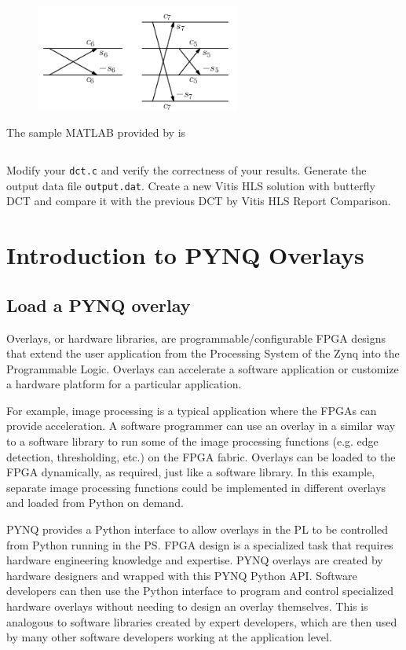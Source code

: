 \documentclass[a4paper,12pt,twoside]{article}
\begin{document}
\begin{figure}[H]
    \centering
    \includegraphics[width=0.6\textwidth]{images/26.png}
\end{figure}
The sample MATLAB provided by \cite{ryg} is
\inputminted[breaklines,linenos]{matlab}{bink_dct_B2.m}
Modify your \texttt{dct.c} and verify the correctness of your results. Generate the output data file \texttt{output.dat}. Create a new Vitis HLS solution with butterfly DCT and compare it with the previous DCT by Vitis HLS Report Comparison.

\section{Introduction to PYNQ Overlays}\label{SPynq}
\subsection{Load a PYNQ overlay}\label{S51}
Overlays, or hardware libraries, are programmable/configurable FPGA designs that extend the user application from the Processing System of the Zynq into the Programmable Logic. Overlays can accelerate a software application or customize a hardware platform for a particular application.

For example, image processing is a typical application where the FPGAs can provide acceleration. A software programmer can use an overlay in a similar way to a software library to run some of the image processing functions (e.g. edge detection, thresholding, etc.) on the FPGA fabric. Overlays can be loaded to the FPGA dynamically, as required, just like a software library. In this example, separate image processing functions could be implemented in different overlays and loaded from Python on demand.

PYNQ provides a Python interface to allow overlays in the PL to be controlled from Python running in the PS. FPGA design is a specialized task that requires hardware engineering knowledge and expertise. PYNQ overlays are created by hardware designers and wrapped with this PYNQ Python API. Software developers can then use the Python interface to program and control specialized hardware overlays without needing to design an overlay themselves. This is analogous to software libraries created by expert developers, which are then used by many other software developers working at the application level.
\end{document}
